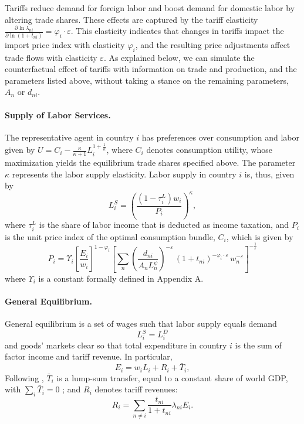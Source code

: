 \documentclass[12pt]{article}
\begin{document}
Tariffs reduce demand for foreign labor and boost demand for domestic labor by altering trade shares. These effects are captured by the tariff elasticity $\frac{\partial \ln \lambda_{ni}}{\partial \ln(1+t_{ni})} = \varphi_i \cdot \varepsilon$. This elasticity indicates that changes in tariffs impact the import price index with elasticity $\varphi_i$, and the resulting price adjustments affect trade flows with elasticity $\varepsilon$. %
As explained below, we can simulate the counterfactual effect of tariffs with information on trade and production, and the parameters listed above, without taking a stance on the remaining parameters, $A_n$ or $d_{ni}$.



\paragraph{Supply of Labor Services.}
The representative agent in country $i$ has preferences over consumption and labor given by $
U = C_i - \frac{\kappa}{\kappa + 1} L_i^{1 + \frac{1}{\kappa}}
$, where $C_i$  denotes consumption utility, whose maximization yields the equilibrium trade shares specified above. The parameter $\kappa$ represents the labor supply elasticity. Labor supply in country $i$ is, thus, given by
\begin{equation}L^{S}_i = \left( \frac{(1 - \tau_{i}^L) w_i}{P_i} \right)^{\kappa},
\end{equation}
where $\tau_{i}^L$ is the share of labor income that is deducted as income taxation, and $P_i$  is the unit price index of the optimal consumption bundle, $C_i$, which is given by
\begin{equation}
\label{eq: eq4}
P_{i}=\Upsilon_{i}\left[\frac{E_i}{w_{i}}\right]^{1-\varphi_i}\left[\sum_{n}\left(\frac{d_{ni}}{A_{n}L_{n}^{\psi}}\right)^{-\varepsilon}\,(1+t_{ni})^{-\varphi_i\cdot\varepsilon}\,w_{n}^{-\varepsilon}\right]^{-\frac{1}{\varepsilon}}
\end{equation}
where $\Upsilon_i$  is a constant formally defined in Appendix A.

\paragraph{General Equilibrium.}
General equilibrium is a set of wages such that labor supply equals demand 
\[L^S_i=L^D_i\]and goods' markets clear so that total expenditure in country $i$ is the sum of factor income and tariff revenue. In particular,
\begin{equation}
E_i = w_i L_i + R_i+\bar{T}_i,
\end{equation}
Following \cite{DEK}, $\bar{T}_i$ is a lump-sum transfer, equal to a constant share of world GDP, with $\sum_i\bar{T}_i=0$ ; and $R_i$ denotes tariff revenues:
\begin{equation} \label{eq: eq_2}
R_i = \sum_{n \neq i} \frac{t_{ni}}{1 + t_{ni}} \lambda_{ni} E_i.
\end{equation}
\end{document}
